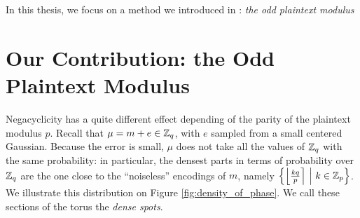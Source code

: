 In this thesis, we focus on a method we introduced in \cite{TCHES:BonPoiRiv24}: \textit{the odd plaintext modulus}

\section{Our Contribution: the Odd Plaintext Modulus}
\label{sec:odd_modulus}

Negacyclicity has a quite different effect depending of the parity of the plaintext modulus $p$. Recall that $\mu = m + e \in \mathbb{Z}_q$, with $e$ sampled from a small centered Gaussian. Because the error is small, $\mu$ does not take all the values of $\mathbb{Z}_q$ with the same probability: in particular, the densest parts in terms of probability over $\mathbb{Z}_q$ are the one close to the ``noiseless'' encodings of $m$, namely $\left \{ \left \lfloor \frac {k q}{p} \right \rceil ~\middle |~ k \in \mathbb{Z}_p \right \}$. We illustrate this distribution on Figure \ref{fig:density_of_phase}. We call these sections of the torus the \emph{dense spots}.


